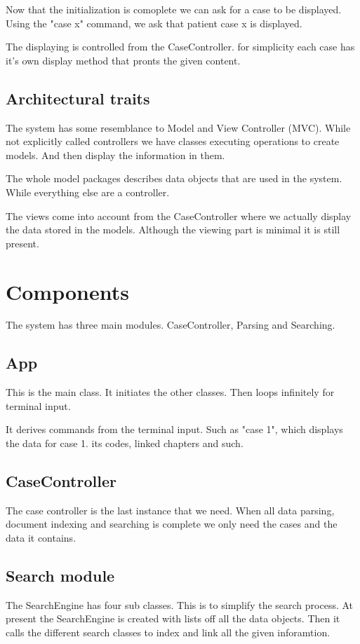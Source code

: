 \documentclass[12pt, a4paper]{article}
\begin{document}
Now that the initialization is comoplete we can ask for a case to be displayed.
Using the "case x" command, we ask that patient case x is displayed. 

The displaying is controlled from the CaseController. for simplicity each case
has it's own display method that pronts the given content.  

\subsection{Architectural traits}
The system has some resemblance to Model and View Controller (MVC).
While not explicitly called controllers we have classes executing operations to
create models. And then display the information in them. 

The whole model packages describes data objects that are used in the system. 
While everything else are a controller. 

The views come into account from the CaseController where we actually display
the data stored in the models.
Although the viewing part is minimal it is still present. 

\section{Components}
The system has three main modules. CaseController, Parsing and Searching. 

\subsection{App}
This is the main class. It initiates the other classes. 
Then loops infinitely for terminal input. 

It derives commands from the terminal input. Such as "case 1", which displays
the data for case 1. its codes, linked chapters and such. 

\subsection{CaseController}
The case controller is the last instance that we need. When all data parsing,
document indexing and searching is complete we only need the cases and the data
it contains. 

\subsection{Search module}
The SearchEngine has four sub classes. This is to simplify the search process. 
At present the SearchEngine is created with lists off all the data objects.
Then it calls the different search classes to index and link all the given
inforamtion. 
\end{document}
